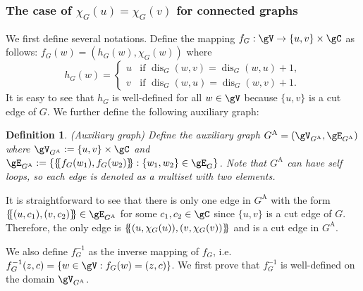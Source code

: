 \documentclass{article} %
\newtheorem{definition}[theorem]{Definition}
\newcommand*{\ldblbrace}{\{\mskip-5mu\{}
\newcommand*{\rdblbrace}{\}\mskip-5mu\}}
\newcommand*{\dis}{{\operatorname{dis}}}
\begin{document}
\subsubsection{The case of \texorpdfstring{$\chi_G(u)= \chi_G(v)$}{χG(u)=χG(v)} for connected graphs}
\label{sec:proof_spdwl_case2}
We first define several notations. Define the mapping $f_G:\gV\to \{u,v\}\times \gC$ as follows: $f_G(w)=(h_G(w),\chi_G(w))$ where
\begin{equation}
\label{eq:proof_spdwl_case2}
    h_G(w)=\left\{\begin{array}{ll}
        u & \text{if } \dis_G(w,v)=\dis_G(w,u)+1,\\
        v & \text{if } \dis_G(w,u)=\dis_G(w,v)+1.
    \end{array}\right.
\end{equation}
It is easy to see that $h_G$ is well-defined for all $w\in\gV$ because $\{u,v\}$ is a cut edge of $G$. We further define the following auxiliary graph:
\begin{definition}
\label{def:aux_graph}
\normalfont (Auxiliary graph) Define the auxiliary graph $G^\mathrm{A}=(\gV_{G^\mathrm{A}},\gE_{G^\mathrm{A}})$ where $\gV_{G^\mathrm{A}}:=\{u,v\}\times \gC$ and $\gE_{G^\mathrm{A}}:=\{\ldblbrace f_G(w_1),f_G(w_2)\rdblbrace:\{w_1,w_2\}\in \gE_G\}$. Note that $G^\mathrm{A}$ can have self loops, so each edge is denoted as a multiset with two elements.
\end{definition}
It is straightforward to see that there is only one edge in $G^\mathrm{A}$ with the form $\ldblbrace(u,c_1),(v,c_2)\rdblbrace\in\gE_{G^\mathrm{A}}$ for some $c_1,c_2\in\gC$ since $\{u,v\}$ is a cut edge of $G$. Therefore, the only edge is $\ldblbrace(u,\chi_G(u)),(v,\chi_G(v))\rdblbrace$ and is a cut edge in $G^\mathrm{A}$.

We also define $f_G^{-1}$ as the inverse mapping of $f_G$, i.e. $f_G^{-1}(z,c)=\{w\in \gV:f_G(w)=(z,c)\}$. We first prove that $f_G^{-1}$ is well-defined on the domain $\gV_{G^\mathrm{A}}$.
\end{document}
